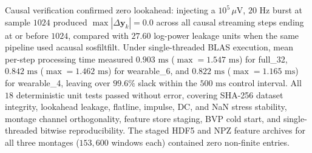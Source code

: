 \documentclass[a4paper,fleqn]{cas-dc}
\begin{document}
Causal verification confirmed zero lookahead: injecting a $10^5\,\mu\text{V}$, $20\text{ Hz}$ burst at sample $1024$ produced $\max|\Delta \mathbf{y}_k| = 0.0$ across all causal streaming steps ending at or before $1024$, compared with $27.60$ log-power leakage units when the same pipeline used acausal sosfiltfilt. Under single-threaded BLAS execution, mean per-step processing time measured $0.903\text{ ms}$ ($\max = 1.547\text{ ms}$) for full\_32, $0.842\text{ ms}$ ($\max = 1.462\text{ ms}$) for wearable\_6, and $0.822\text{ ms}$ ($\max = 1.165\text{ ms}$) for wearable\_4, leaving over $99.6\%$ slack within the $500\text{ ms}$ control interval. All $18$ deterministic unit tests passed without error, covering SHA-256 dataset integrity, lookahead leakage, flatline, impulse, DC, and NaN stress stability, montage channel orthogonality, feature store staging, BVP cold start, and single-threaded bitwise reproducibility. The staged HDF5 and NPZ feature archives for all three montages ($153,600$ windows each) contained zero non-finite entries.

\printcredits



\end{document}
